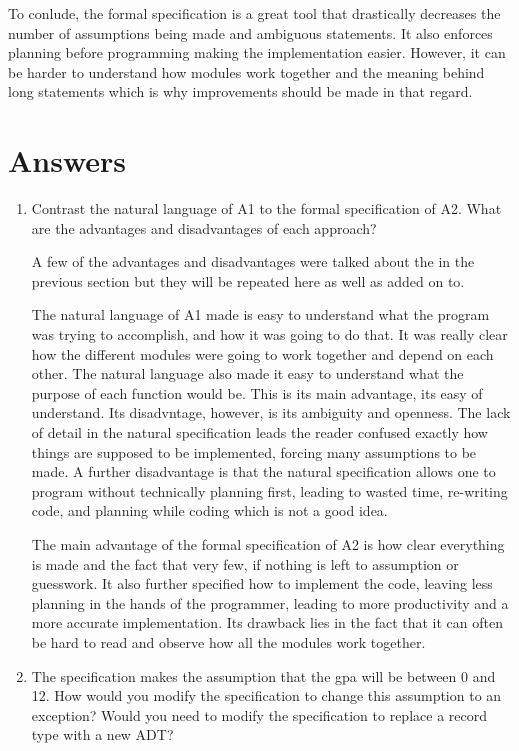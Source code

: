 \documentclass[12pt]{article}
\begin{document}
To conlude, the formal specification is a great tool that drastically
decreases the number of assumptions being made and ambiguous statements.
It also enforces planning before programming making the implementation easier.
However, it can be harder to understand how modules work together and the meaning
behind long statements which is why improvements should be made in that regard.

\section{Answers}

\begin{enumerate}

\item Contrast the natural language of A1 to the formal specification of A2.
What are the advantages and disadvantages of each approach?

A few of the advantages and disadvantages were talked about the in the previous
section but they will be repeated here as well as added on to.

The natural language of A1 made is easy to understand what the program was
trying to accomplish, and how it was going to do that. It was really clear
how the different modules were going to work together and depend on each
other. The natural language also made it easy to understand what the purpose
of each function would be. This is its main advantage, its easy of understand.
Its disadvntage, however, is its ambiguity and openness. The lack of detail
in the natural specification leads the reader confused exactly how things
are supposed to be implemented, forcing many assumptions to be made. A further
disadvantage is that the natural specification allows one to program without
technically planning first, leading to wasted time, re-writing code,
and planning while coding which is not a good idea.

The main advantage of the formal specification of A2 is how clear everything is
made and the fact that very few, if nothing is left to assumption or guesswork.
It also further specified how to implement the code, leaving less planning
in the hands of the programmer, leading to more productivity and a more accurate
implementation. Its drawback lies in the fact that it can often be hard to read
and observe how all the modules work together.

\item The specification makes the assumption that the gpa will be between 0 and 12.
How would you modify the specification to change this assumption to an exception?
Would you need to modify the specification to replace a record type with a new ADT?


\end{enumerate}
\end{document}
